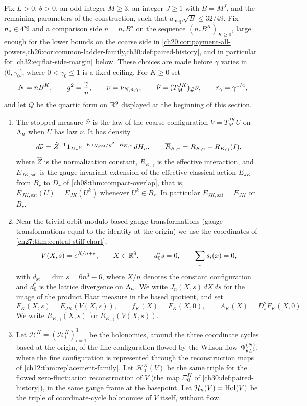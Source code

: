 \begin{definition}\label{ch32:def:core-insertions}
Fix $L>0$, $\theta>0$, an odd integer $M\ge3$, an integer $J\ge1$ with $B=M^J$, and the remaining parameters of the construction, such that $a_{\mathrm{map}}\sqrt B\le32/49$. Fix $n_*\in4\mathbb N$ and a comparison side $n=n_*B^{a}$ on the sequence $(n_*B^K)_{K\ge0}$, large enough for the lower bounds on the coarse side in \cref{ch20:cor:payment-all-powers,ch26:cor:common-ladder-family,ch30:def:paired-history}, and in particular for \eqref{ch32:eq:flat-side-margin} below. These choices are made before $\gamma$ varies in $(0,\gamma_0]$, where $0<\gamma_0\le1$ is a fixed ceiling. For $K\ge0$ set
\[
 N=nB^K,\qquad g^2=\frac\gamma n,\qquad \nu=\nu_{N,n,\gamma},\qquad \widehat\nu=(T_M^{JK})_\#\nu,\qquad r_\gamma=\gamma^{1/4},
\]
and let $Q$ be the quartic form on $\mathbb R^9$ displayed at the beginning of this section.
\begin{enumerate}
\item The stopped measure $\widehat\nu$ is the law of the coarse configuration $V=T_M^{JK}U$ on $\Lambda_{n}$ when $U$ has law $\nu$. It has density
\[
 d\widehat\nu=\widehat Z^{-1}\mathbf 1_{D_r}e^{-E_{JK,\mathrm{sat}}/g^2-\overline R_{K,\gamma}}\,dH_n,\qquad \overline R_{K,\gamma}=R_{K,\gamma}-R_{K,\gamma}(I),
\]
where $\widehat Z$ is the normalization constant, $R_{K,\gamma}$ is the effective interaction, and $E_{JK,\mathrm{sat}}$ is the gauge-invariant extension of the effective classical action $E_{JK}$ from $B_r$ to $D_r$ of \cref{ch08:thm:compact-overlap}, that is, $E_{JK,\mathrm{sat}}(U)=E_{JK}(U^k)$ whenever $U^k\in B_r$. In particular $E_{JK,\mathrm{sat}}=E_{JK}$ on $B_r$.
\item Near the trivial orbit modulo based gauge transformations (gauge transformations equal to the identity at the origin) we use the coordinates of \cref{ch27:thm:central-stiff-chart},
\[
 V(X,s)=e^{X/n+s},\qquad X\in\mathbb R^9,\qquad d_0^*s=0,\qquad \sum_xs_i(x)=0,
\]
with $d_{\mathrm{st}}=\dim s=6n^3-6$,
where $X/n$ denotes the constant configuration and $d_0^*$ is the lattice divergence on $\Lambda_{n}$. We write $J_n(X,s)\,dX\,ds$ for the image of the product Haar measure in the based quotient, and set
\[
 F_K(X,s)=E_{JK}(V(X,s)),\qquad f_K(X)=F_K(X,0),\qquad A_K(X)=D_s^2F_K(X,0).
\]
We write $\overline R_{K,\gamma}(X,s)$ for $\overline R_{K,\gamma}(V(X,s))$.
\item Let $\mathcal H^K=(\mathcal H^K_i)_{i=1}^3$ be the holonomies, around the three coordinate cycles based at the origin, of the fine configuration flowed by the Wilson flow $\Psi^{(N)}_{\theta L^2}$, where the fine configuration is represented through the reconstruction maps of \cref{ch12:thm:replacement-family}. Let $\mathcal H^K_0(V)$ be the same triple for the flowed zero-fluctuation reconstruction of $V$ (the map $\Xi_0^K$ of \cref{ch30:def:paired-history}), in the same gauge frame at the basepoint. Let $\mathcal H_n(V)=\operatorname{Hol}(V)$ be the triple of coordinate-cycle holonomies of $V$ itself, without flow.

\end{enumerate}
\end{definition}
